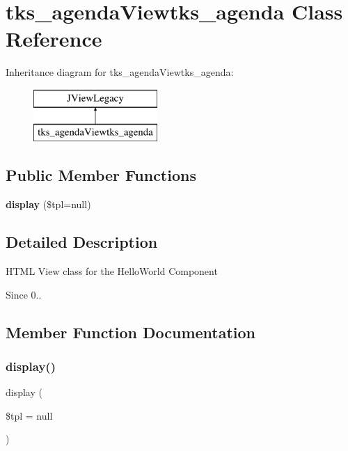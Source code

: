 \section{tks\+\_\+agenda\+Viewtks\+\_\+agenda Class Reference}
\label{classtks__agenda_viewtks__agenda}
Inheritance diagram for tks\+\_\+agenda\+Viewtks\+\_\+agenda\+:\begin{figure}[H]
\begin{center}
\leavevmode
\includegraphics[height=2.000000cm]{classtks__agenda_viewtks__agenda}
\end{center}
\end{figure}
\subsection*{Public Member Functions}
\begin{DoxyCompactItemize}
\item 
\textbf{ display} (\$tpl=null)
\end{DoxyCompactItemize}


\subsection{Detailed Description}
H\+T\+ML View class for the Hello\+World Component

\begin{DoxySince}{Since}
0.. 
\end{DoxySince}


\subsection{Member Function Documentation}
\mbox{\label{classtks__agenda_viewtks__agenda_aa988850da0dbeb9875debea0280754d5}} 
\subsubsection{display()}
{\footnotesize\ttfamily display (\begin{DoxyParamCaption}\item[{}]{\$tpl = {\ttfamily null} }\end{DoxyParamCaption})}

